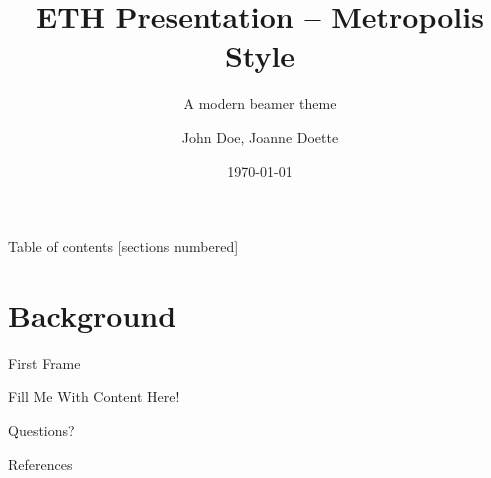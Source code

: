 \documentclass[10pt]{beamer}
\title{ETH Presentation -- Metropolis Style}
\subtitle{A modern beamer theme}
\date{\today}
\author{John Doe, Joanne Doette}
\institute{}
\begin{document}
\maketitle

\begin{frame}{Table of contents}
  [sections numbered]
  \tableofcontents[hideallsubsections]
\end{frame}

\section{Background}

\begin{frame}{First Frame}    
    \begin{alertblock}{Fill Me With Content}
    	Here!
    \end{alertblock}
\end{frame}


\begin{frame}[standout]
  Questions?
\end{frame}

\begin{frame}[allowframebreaks]{References}

  
  

\end{frame}

\appendix
\end{document}
